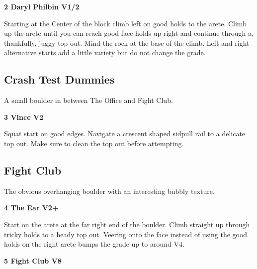 \begin{multicols}{2}
					\label{rt:Daryl Philbin}
\colorbox{green!20}{
\parbox{0.95\linewidth}{
\textbf{
2 Daryl Philbin V1/2     \warn \warn 
}
}
}

					\begin{adjustwidth}{0.5cm}{}				
					Starting at the Center of the block climb left on good holds to the arete. Climb up the arete until you can reach good face holds up right and continue through a, thankfully, juggy top out. Mind the rock at the base of the climb. Left and right alternative starts add a little variety but do not change the grade.
					\end{adjustwidth}
			\subsection*{Crash Test Dummies}\label{bf:Crash Test Dummies}
			A small boulder in between The Office and Fight Club.\\
			
					\label{rt:Vince}
\colorbox{green!20}{
\parbox{0.95\linewidth}{
\textbf{
3 Vince V2    
}
}
}

					\begin{adjustwidth}{0.5cm}{}				
					Squat start on good edges. Navigate a crescent shaped sidpull rail to a delicate top out. Make sure to clean the top out before attempting.
					\end{adjustwidth}
			\subsection*{Fight Club}\label{bf:Fight Club}
			The obvious overhanging boulder with an interesting bubbly texture.\\
			

					\label{rt:The Ear}
\colorbox{green!20}{
\parbox{0.95\linewidth}{
\textbf{
4 The Ear V2+     
}
}
}

					\begin{adjustwidth}{0.5cm}{}				
					Start on the arete at the far right end of the boulder. Climb straight up through tricky holds to a heady top out. Veering onto the face instead of using the good holds on the right arete bumps the grade up to around V4.
					\end{adjustwidth}
					\label{rt:Fight Club}
\colorbox{Goldenrod!50}{
\parbox{0.95\linewidth}{
\textbf{
5 Fight Club V8     
}
}
}


\end{multicols}

